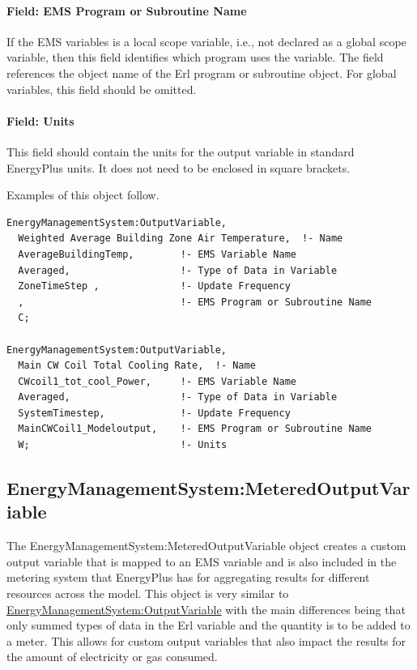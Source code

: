 \paragraph{Field: EMS Program or Subroutine Name}\label{field-ems-program-or-subroutine-name}

If the EMS variables is a local scope variable, i.e., not declared as a global scope variable, then this field identifies which program uses the variable. The field references the object name of the Erl program or subroutine object. For global variables, this field should be omitted.

\paragraph{Field: Units}\label{field-units}

This field should contain the units for the output variable in standard EnergyPlus units. It does not need to be enclosed in square brackets.

Examples of this object follow.

\begin{lstlisting}
EnergyManagementSystem:OutputVariable,
  Weighted Average Building Zone Air Temperature,  !- Name
  AverageBuildingTemp,        !- EMS Variable Name
  Averaged,                   !- Type of Data in Variable
  ZoneTimeStep ,              !- Update Frequency
  ,                           !- EMS Program or Subroutine Name
  C;

EnergyManagementSystem:OutputVariable,
  Main CW Coil Total Cooling Rate,  !- Name
  CWcoil1_tot_cool_Power,     !- EMS Variable Name
  Averaged,                   !- Type of Data in Variable
  SystemTimestep,             !- Update Frequency
  MainCWCoil1_Modeloutput,    !- EMS Program or Subroutine Name
  W;                          !- Units
\end{lstlisting}

\subsection{EnergyManagementSystem:MeteredOutputVariable}\label{energymanagementsystemmeteredoutputvariable}

The EnergyManagementSystem:MeteredOutputVariable object creates a custom output variable that is mapped to an EMS variable and is also included in the metering system that EnergyPlus has for aggregating results for different resources across the model. This object is very similar to \hyperref[energymanagementsystemoutputvariable]{EnergyManagementSystem:OutputVariable} with the main differences being that only summed types of data in the Erl variable and the quantity is to be added to a meter. This allows for custom output variables that also impact the results for the amount of electricity or gas consumed.

